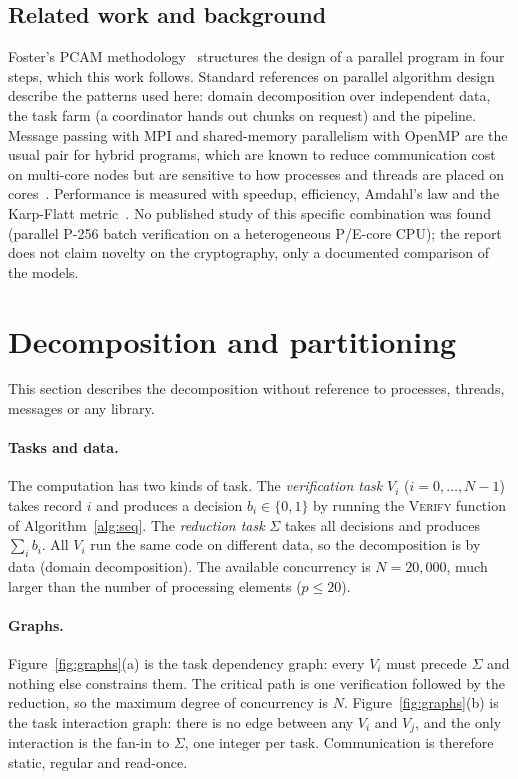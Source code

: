 \documentclass[10pt,a4paper]{article}
\begin{document}
\subsection{Related work and background}

Foster's PCAM methodology~\cite{foster} structures the design of a parallel program in four steps, which this work follows. Standard references on parallel algorithm design~\cite{grama} describe the patterns used here: domain decomposition over independent data, the task farm (a coordinator hands out chunks on request) and the pipeline. Message passing with MPI and shared-memory parallelism with OpenMP are the usual pair for hybrid programs, which are known to reduce communication cost on multi-core nodes but are sensitive to how processes and threads are placed on cores~\cite{rabenseifner}. Performance is measured with speedup, efficiency, Amdahl's law and the Karp-Flatt metric~\cite{karpflatt}. No published study of this specific combination was found (parallel P-256 batch verification on a heterogeneous P/E-core CPU); the report does not claim novelty on the cryptography, only a documented comparison of the models.

\section{Decomposition and partitioning}\label{sec:partitioning}

This section describes the decomposition without reference to processes, threads, messages or any library.

\paragraph{Tasks and data.} The computation has two kinds of task. The \emph{verification task} $V_i$ ($i=0,\dots,N-1$) takes record $i$ and produces a decision $b_i\in\{0,1\}$ by running the \textsc{Verify} function of Algorithm~\ref{alg:seq}. The \emph{reduction task} $\Sigma$ takes all decisions and produces $\sum_i b_i$. All $V_i$ run the same code on different data, so the decomposition is by data (domain decomposition). The available concurrency is $N=20{,}000$, much larger than the number of processing elements ($p\le 20$).

\paragraph{Graphs.} Figure~\ref{fig:graphs}(a) is the task dependency graph: every $V_i$ must precede $\Sigma$ and nothing else constrains them. The critical path is one verification followed by the reduction, so the maximum degree of concurrency is $N$. Figure~\ref{fig:graphs}(b) is the task interaction graph: there is no edge between any $V_i$ and $V_j$, and the only interaction is the fan-in to $\Sigma$, one integer per task. Communication is therefore static, regular and read-once.
\end{document}
